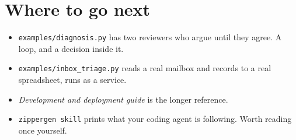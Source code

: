 \documentclass[11pt,a4paper]{article}
\begin{document}
\section{Where to go next}

\begin{itemize}
  \item \texttt{examples/diagnosis.py} has two reviewers who argue until they agree.
        A loop, and a decision inside it.
  \item \texttt{examples/inbox\_triage.py} reads a real mailbox and records to a
        real spreadsheet, runs as a service.
  \item \emph{Development and deployment guide} is the longer reference.
  \item \texttt{zippergen skill} prints what your coding agent is following. Worth
        reading once yourself.
\end{itemize}
\end{document}
